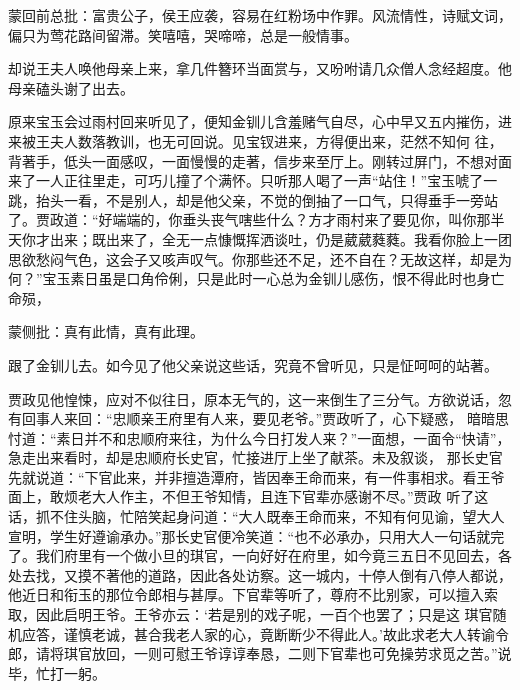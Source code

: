 \begin{parag}
    \begin{note}蒙回前总批：富贵公子，侯王应袭，容易在红粉场中作罪。风流情性，诗赋文词，偏只为莺花路间留滞。笑嘻嘻，哭啼啼，总是一般情事。\end{note}
\end{parag}


\begin{parag}
    却说王夫人唤他母亲上来，拿几件簪环当面赏与，又吩咐请几众僧人念经超度。他母亲磕头谢了出去。
\end{parag}


\begin{parag}
    原来宝玉会过雨村回来听见了，便知金钏儿含羞赌气自尽，心中早又五内摧伤，进来被王夫人数落教训，也无可回说。见宝钗进来，方得便出来，茫然不知何 往，背著手，低头一面感叹，一面慢慢的走著，信步来至厅上。刚转过屏门，不想对面来了一人正往里走，可巧儿撞了个满怀。只听那人喝了一声“站住！”宝玉唬了一跳，抬头一看，不是别人，却是他父亲，不觉的倒抽了一口气，只得垂手一旁站了。贾政道：“好端端的，你垂头丧气嗐些什么？方才雨村来了要见你，叫你那半天你才出来；既出来了，全无一点慷慨挥洒谈吐，仍是葳葳蕤蕤。我看你脸上一团思欲愁闷气色，这会子又咳声叹气。你那些还不足，还不自在？无故这样，却是为何？”宝玉素日虽是口角伶俐，只是此时一心总为金钏儿感伤，恨不得此时也身亡命殒，\begin{note}蒙侧批：真有此情，真有此理。\end{note}跟了金钏儿去。如今见了他父亲说这些话，究竟不曾听见，只是怔呵呵的站著。
\end{parag}


\begin{parag}
    贾政见他惶悚，应对不似往日，原本无气的，这一来倒生了三分气。方欲说话，忽有回事人来回：“忠顺亲王府里有人来，要见老爷。”贾政听了，心下疑惑， 暗暗思忖道：“素日并不和忠顺府来往，为什么今日打发人来？”一面想，一面令“快请”，急走出来看时，却是忠顺府长史官，忙接进厅上坐了献茶。未及叙谈， 那长史官先就说道：“下官此来，并非擅造潭府，皆因奉王命而来，有一件事相求。看王爷面上，敢烦老大人作主，不但王爷知情，且连下官辈亦感谢不尽。”贾政 听了这话，抓不住头脑，忙陪笑起身问道：“大人既奉王命而来，不知有何见谕，望大人宣明，学生好遵谕承办。”那长史官便冷笑道：“也不必承办，只用大人一句话就完了。我们府里有一个做小旦的琪官，一向好好在府里，如今竟三五日不见回去，各处去找，又摸不著他的道路，因此各处访察。这一城内，十停人倒有八停人都说，他近日和衔玉的那位令郎相与甚厚。下官辈等听了，尊府不比别家，可以擅入索取，因此启明王爷。王爷亦云：‘若是别的戏子呢，一百个也罢了；只是这 琪官随机应答，谨慎老诚，甚合我老人家的心，竟断断少不得此人。’故此求老大人转谕令郎，请将琪官放回，一则可慰王爷谆谆奉恳，二则下官辈也可免操劳求觅之苦。”说毕，忙打一躬。
\end{parag}


